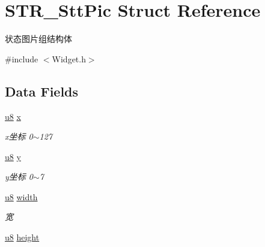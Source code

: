 \hypertarget{struct_s_t_r___stt_pic}{\section{\-S\-T\-R\-\_\-\-Stt\-Pic \-Struct \-Reference}
\label{struct_s_t_r___stt_pic}
}


状态图片组结构体  




{\ttfamily \#include $<$\-Widget.\-h$>$}

\subsection*{\-Data \-Fields}
\begin{DoxyCompactItemize}
\item 
\hypertarget{struct_s_t_r___stt_pic_a66ab7498cbcfba822aa9a2891beffae2}{\hyperlink{group___b_s_p_gaed742c436da53c1080638ce6ef7d13de}{u8} \hyperlink{struct_s_t_r___stt_pic_a66ab7498cbcfba822aa9a2891beffae2}{x}}\label{struct_s_t_r___stt_pic_a66ab7498cbcfba822aa9a2891beffae2}

\begin{DoxyCompactList}\small\item\em x坐标 0$\sim$127 \end{DoxyCompactList}\item 
\hypertarget{struct_s_t_r___stt_pic_ad87f9078b74ef74a58041131d06283c2}{\hyperlink{group___b_s_p_gaed742c436da53c1080638ce6ef7d13de}{u8} \hyperlink{struct_s_t_r___stt_pic_ad87f9078b74ef74a58041131d06283c2}{y}}\label{struct_s_t_r___stt_pic_ad87f9078b74ef74a58041131d06283c2}

\begin{DoxyCompactList}\small\item\em y坐标 0$\sim$7 \end{DoxyCompactList}\item 
\hypertarget{struct_s_t_r___stt_pic_a2c1d87ba049f447519d1a92e6550f822}{\hyperlink{group___b_s_p_gaed742c436da53c1080638ce6ef7d13de}{u8} \hyperlink{struct_s_t_r___stt_pic_a2c1d87ba049f447519d1a92e6550f822}{width}}\label{struct_s_t_r___stt_pic_a2c1d87ba049f447519d1a92e6550f822}

\begin{DoxyCompactList}\small\item\em 宽 \end{DoxyCompactList}\item 
\hypertarget{struct_s_t_r___stt_pic_ac3f221619d1bd1d6f1d46727f0c913a2}{\hyperlink{group___b_s_p_gaed742c436da53c1080638ce6ef7d13de}{u8} \hyperlink{struct_s_t_r___stt_pic_ac3f221619d1bd1d6f1d46727f0c913a2}{height}}\label{struct_s_t_r___stt_pic_ac3f221619d1bd1d6f1d46727f0c913a2}


\end{DoxyCompactItemize}

